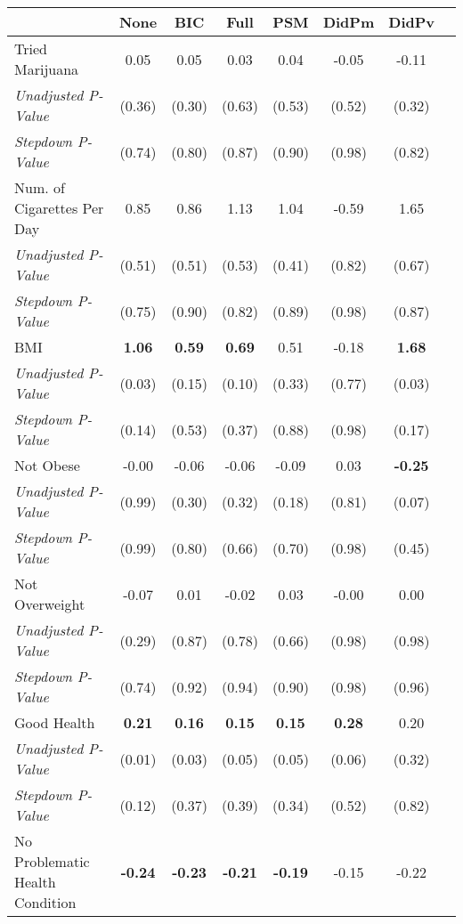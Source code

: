 \begin{tabular}{l c c c c c c c}
\toprule
 & None & BIC & Full & PSM & DidPm & DidPv \\
\midrule
Tried Marijuana & 0.05 & 0.05 & 0.03 & 0.04 & -0.05 & -0.11 \\
\quad \textit{Unadjusted P-Value} & (0.36) & (0.30) & (0.63) & (0.53) & (0.52) & (0.32) \\
\quad \textit{Stepdown P-Value} & (0.74) & (0.80) & (0.87) & (0.90) & (0.98) & (0.82) \\
Num. of Cigarettes Per Day & 0.85 & 0.86 & 1.13 & 1.04 & -0.59 & 1.65 \\
\quad \textit{Unadjusted P-Value} & (0.51) & (0.51) & (0.53) & (0.41) & (0.82) & (0.67) \\
\quad \textit{Stepdown P-Value} & (0.75) & (0.90) & (0.82) & (0.89) & (0.98) & (0.87) \\
BMI & \textbf{ 1.06 } & \textbf{ 0.59 } & \textbf{ 0.69 } & 0.51 & -0.18 & \textbf{ 1.68 } \\
\quad \textit{Unadjusted P-Value} & (0.03) & (0.15) & (0.10) & (0.33) & (0.77) & (0.03) \\
\quad \textit{Stepdown P-Value} & (0.14) & (0.53) & (0.37) & (0.88) & (0.98) & (0.17) \\
Not Obese & -0.00 & -0.06 & -0.06 & -0.09 & 0.03 & \textbf{ -0.25 } \\
\quad \textit{Unadjusted P-Value} & (0.99) & (0.30) & (0.32) & (0.18) & (0.81) & (0.07) \\
\quad \textit{Stepdown P-Value} & (0.99) & (0.80) & (0.66) & (0.70) & (0.98) & (0.45) \\
Not Overweight & -0.07 & 0.01 & -0.02 & 0.03 & -0.00 & 0.00 \\
\quad \textit{Unadjusted P-Value} & (0.29) & (0.87) & (0.78) & (0.66) & (0.98) & (0.98) \\
\quad \textit{Stepdown P-Value} & (0.74) & (0.92) & (0.94) & (0.90) & (0.98) & (0.96) \\
Good Health & \textbf{ 0.21 } & \textbf{ 0.16 } & \textbf{ 0.15 } & \textbf{ 0.15 } & \textbf{ 0.28 } & 0.20 \\
\quad \textit{Unadjusted P-Value} & (0.01) & (0.03) & (0.05) & (0.05) & (0.06) & (0.32) \\
\quad \textit{Stepdown P-Value} & (0.12) & (0.37) & (0.39) & (0.34) & (0.52) & (0.82) \\
No Problematic Health Condition & \textbf{ -0.24 } & \textbf{ -0.23 } & \textbf{ -0.21 } & \textbf{ -0.19 } & -0.15 & -0.22 \\

\end{tabular}
